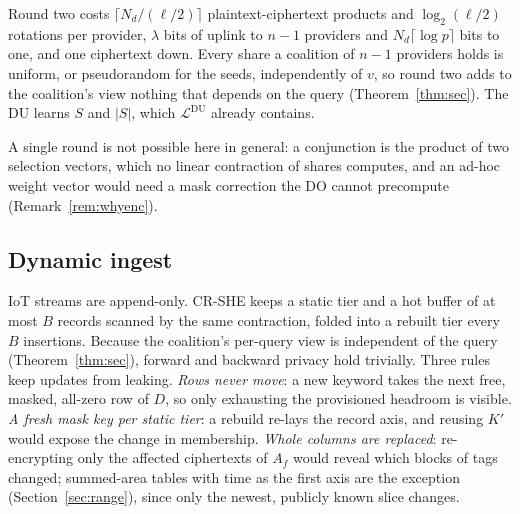\documentclass[a4paper,fleqn]{cas-sc}
\newcommand{\Leak}{\mathcal{L}}
\begin{document}
Round two costs $\lceil N_d/(\ell/2)\rceil$ plaintext-ciphertext products and
$\log_2(\ell/2)$ rotations per provider, $\lambda$ bits of uplink to $n-1$
providers and $N_d\lceil\log p\rceil$ bits to one, and one ciphertext down.
Every share a coalition of $n-1$ providers holds is uniform, or pseudorandom
for the seeds, independently of $v$, so round two adds to the coalition's view
nothing that depends on the query (Theorem~\ref{thm:sec}). The DU learns $S$
and $|S|$, which $\Leak^{\text{DU}}$ already contains.

A single round is not possible here in general: a conjunction is the product
of two selection vectors, which no linear contraction of shares computes, and
an ad-hoc weight vector would need a mask correction the DO cannot precompute
(Remark~\ref{rem:whyenc}).

\subsection{Dynamic ingest}
\label{sec:ingest}
IoT streams are append-only. CR-SHE keeps a static tier and a hot buffer of at
most $B$ records scanned by the same contraction, folded into a rebuilt tier
every $B$ insertions. Because the coalition's per-query view is independent of
the query (Theorem~\ref{thm:sec}), forward and backward privacy hold trivially.
Three rules keep updates from leaking. \emph{Rows never move}: a new keyword
takes the next free, masked, all-zero row of $D$, so only exhausting the
provisioned headroom is visible. \emph{A fresh mask key per static tier}: a
rebuild re-lays the record axis, and reusing $K'$ would expose the change in
membership. \emph{Whole columns are replaced}: re-encrypting only the affected
ciphertexts of $A_f$ would reveal which blocks of tags changed; summed-area
tables with time as the first axis are the exception
(Section~\ref{sec:range}), since only the newest, publicly known slice changes.
\end{document}

